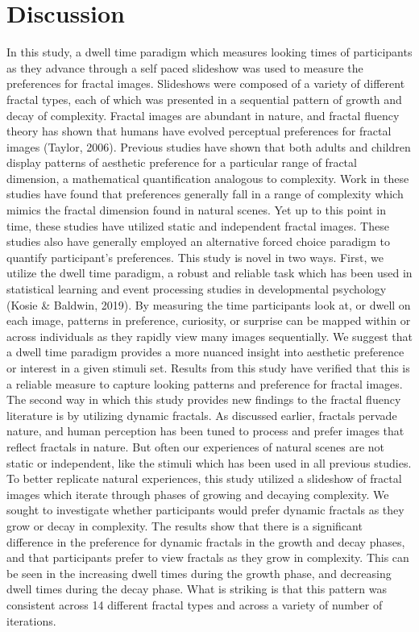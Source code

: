 \documentclass[english,jou]{apa6}
\begin{document}
\hypertarget{discussion}{%
\section{Discussion}\label{discussion}}

In this study, a dwell time paradigm which measures looking times of participants as they advance through a self paced slideshow was used to measure the preferences for fractal images. Slideshows were composed of a variety of different fractal types, each of which was presented in a sequential pattern of growth and decay of complexity. Fractal images are abundant in nature, and fractal fluency theory has shown that humans have evolved perceptual preferences for fractal images (Taylor, 2006). Previous studies have shown that both adults and children display patterns of aesthetic preference for a particular range of fractal dimension, a mathematical quantification analogous to complexity. Work in these studies have found that preferences generally fall in a range of complexity which mimics the fractal dimension found in natural scenes. Yet up to this point in time, these studies have utilized static and independent fractal images. These studies also have generally employed an alternative forced choice paradigm to quantify participant's preferences. This study is novel in two ways. First, we utilize the dwell time paradigm, a robust and reliable task which has been used in statistical learning and event processing studies in developmental psychology (Kosie \& Baldwin, 2019). By measuring the time participants look at, or dwell on each image, patterns in preference, curiosity, or surprise can be mapped within or across individuals as they rapidly view many images sequentially. We suggest that a dwell time paradigm provides a more nuanced insight into aesthetic preference or interest in a given stimuli set. Results from this study have verified that this is a reliable measure to capture looking patterns and preference for fractal images. The second way in which this study provides new findings to the fractal fluency literature is by utilizing dynamic fractals. As discussed earlier, fractals pervade nature, and human perception has been tuned to process and prefer images that reflect fractals in nature. But often our experiences of natural scenes are not static or independent, like the stimuli which has been used in all previous studies. To better replicate natural experiences, this study utilized a slideshow of fractal images which iterate through phases of growing and decaying complexity. We sought to investigate whether participants would prefer dynamic fractals as they grow or decay in complexity. The results show that there is a significant difference in the preference for dynamic fractals in the growth and decay phases, and that participants prefer to view fractals as they grow in complexity. This can be seen in the increasing dwell times during the growth phase, and decreasing dwell times during the decay phase. What is striking is that this pattern was consistent across 14 different fractal types and across a variety of number of iterations.
\end{document}
